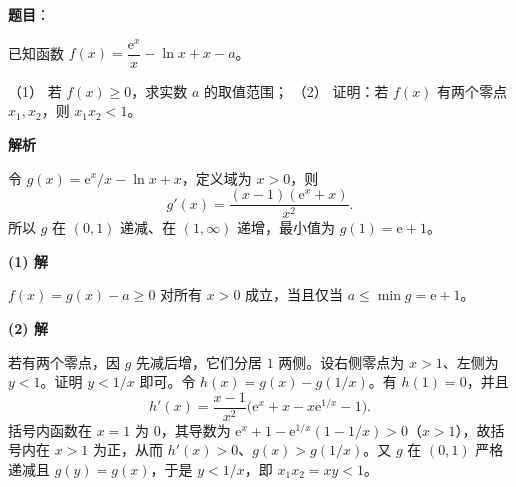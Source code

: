 \begin{answer}

\textbf{题目}：

已知函数 $f(x)=\dfrac{\mathrm e^x}{x}-\ln x+x-a$。

（1） 若 $f(x)\ge0$，求实数 $a$ 的取值范围；  
（2） 证明：若 $f(x)$ 有两个零点 $x_1,x_2$，则 $x_1x_2<1$。

\textbf{解析}

令 $g(x)=\mathrm e^x/x-\ln x+x$，定义域为 $x>0$，则
\nopagebreak[4]
\[
g'(x)=\frac{(x-1)(\mathrm e^x+x)}{x^2}.
\]
所以 $g$ 在 $(0,1)$ 递减、在 $(1,\infty)$ 递增，最小值为 $g(1)=\mathrm e+1$。

\textbf{(1) 解}

$f(x)=g(x)-a\ge0$ 对所有 $x>0$ 成立，当且仅当 $a\le\min g=\mathrm e+1$。

\textbf{(2) 解}

若有两个零点，因 $g$ 先减后增，它们分居 $1$ 两侧。设右侧零点为 $x>1$、左侧为 $y<1$。证明 $y<1/x$ 即可。令 $h(x)=g(x)-g(1/x)$。有 $h(1)=0$，并且
\nopagebreak[4]
\[
h'(x)=\frac{x-1}{x^2}\bigl(\mathrm e^x+x-x\mathrm e^{1/x}-1\bigr).
\]
括号内函数在 $x=1$ 为 $0$，其导数为 $\mathrm e^x+1-\mathrm e^{1/x}(1-1/x)>0$（$x>1$），故括号内在 $x>1$ 为正，从而 $h'(x)>0$、$g(x)>g(1/x)$。又 $g$ 在 $(0,1)$ 严格递减且 $g(y)=g(x)$，于是 $y<1/x$，即 $x_1x_2=xy<1$。



\end{answer}
